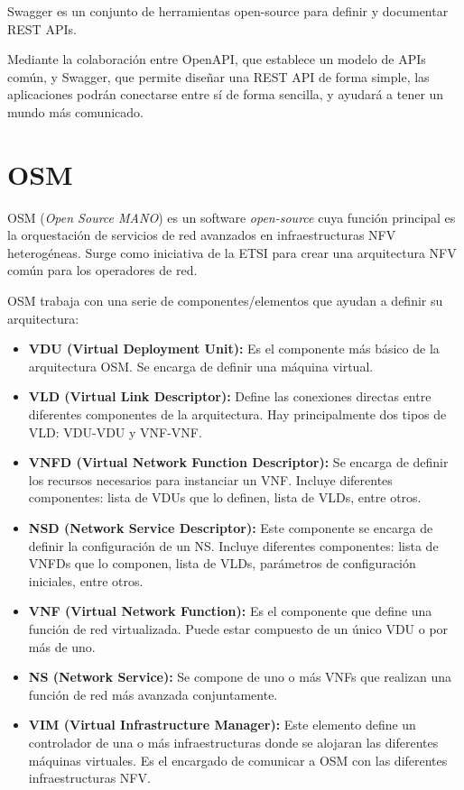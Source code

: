 Swagger\cite{swaggerbib} es un conjunto de herramientas open-source para definir y documentar REST APIs.

Mediante la colaboración entre OpenAPI, que establece un modelo de APIs común, y Swagger, que permite diseñar una REST API de forma simple, las aplicaciones podrán conectarse entre sí de forma sencilla, y ayudará a tener un mundo más comunicado.

\section{OSM}
\label{sec:osm}

OSM (\textit{Open Source MANO})\cite{osmbib} es un software \textit{open-source} cuya función principal es la orquestación de servicios de red avanzados en infraestructuras NFV heterogéneas. Surge como iniciativa de la ETSI para crear una arquitectura NFV común para los operadores de red.

OSM trabaja con una serie de componentes/elementos que ayudan a definir su arquitectura:

\begin{itemize}
	\item \textbf{VDU (Virtual Deployment Unit):} Es el componente más básico de la arquitectura OSM. Se encarga de definir una máquina virtual. 
	
	\item \textbf{VLD (Virtual Link Descriptor):} Define las conexiones directas entre diferentes componentes de la arquitectura. Hay principalmente dos tipos de VLD: VDU-VDU y VNF-VNF.
	
	\item \textbf{VNFD (Virtual Network Function Descriptor):} Se encarga de definir los recursos necesarios para instanciar un VNF. Incluye diferentes componentes: lista de VDUs que lo definen, lista de VLDs, entre otros.
	
	\item \textbf{NSD (Network Service Descriptor):} Este componente se encarga de definir la configuración de un NS. Incluye diferentes componentes: lista de VNFDs que lo componen, lista de VLDs, parámetros de configuración iniciales, entre otros.
	
	\item \textbf{VNF (Virtual Network Function):} Es el componente que define una función de red virtualizada. Puede estar compuesto de un único VDU o por más de uno.
	
	\item \textbf{NS (Network Service):} Se compone de uno o más VNFs que realizan una función de red más avanzada conjuntamente.
	
	\item \textbf{VIM (Virtual Infrastructure Manager):} Este elemento define un controlador de una o más infraestructuras donde se alojaran las diferentes máquinas virtuales. Es el encargado de comunicar a OSM con las diferentes infraestructuras NFV.
\end{itemize}

